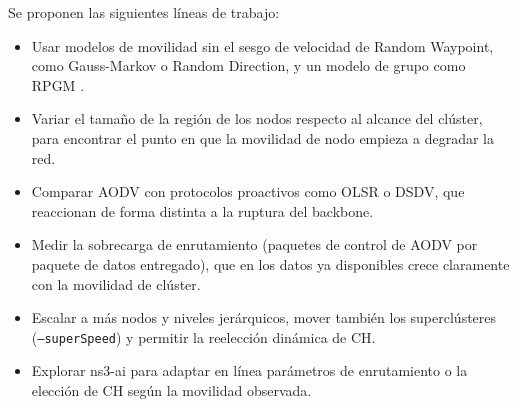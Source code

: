 Se proponen las siguientes líneas de trabajo:

\begin{itemize}
    \item Usar modelos de movilidad sin el sesgo de velocidad de Random Waypoint, como
    Gauss-Markov o Random Direction, y un modelo de grupo como RPGM
    \cite{hong1999group, camp2002survey}.
    \item Variar el tamaño de la región de los nodos respecto al alcance del clúster,
    para encontrar el punto en que la movilidad de nodo empieza a degradar la red.
    \item Comparar AODV con protocolos proactivos como OLSR \cite{clausen2003olsr} o
    DSDV, que reaccionan de forma distinta a la ruptura del backbone.
    \item Medir la sobrecarga de enrutamiento (paquetes de control de AODV por paquete
    de datos entregado), que en los datos ya disponibles crece claramente con la
    movilidad de clúster.
    \item Escalar a más nodos y niveles jerárquicos, mover también los superclústeres
    (\texttt{--superSpeed}) y permitir la reelección dinámica de CH.
    \item Explorar ns3-ai para adaptar en línea parámetros de enrutamiento o la
    elección de CH según la movilidad observada.
\end{itemize}
